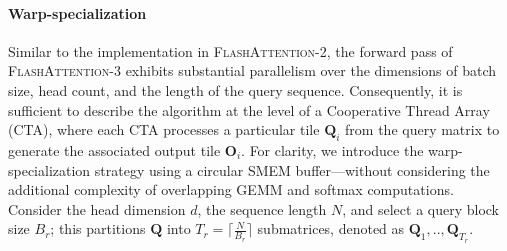 \paragraph{Warp-specialization}
Similar to the implementation in \textsc{FlashAttention-2}, the forward pass of \textsc{FlashAttention-3} exhibits substantial parallelism over the dimensions of batch size, head count, and the length of the query sequence. Consequently, it is sufficient to describe the algorithm at the level of a Cooperative Thread Array (CTA), where each CTA processes a particular tile $\mathbf{Q}_i$ from the query matrix to generate the associated output tile $\mathbf{O}_i$. For clarity, we introduce the warp-specialization strategy using a circular SMEM buffer—without considering the additional complexity of overlapping GEMM and softmax computations. Consider the head dimension $d$, the sequence length $N$, and select a query block size $B_r$; this partitions $\mathbf{Q}$ into $T_r = \lceil \frac{N}{B_r} \rceil$ submatrices, denoted as $\mathbf{Q}_1, .., \mathbf{Q}_{T_r}$.

